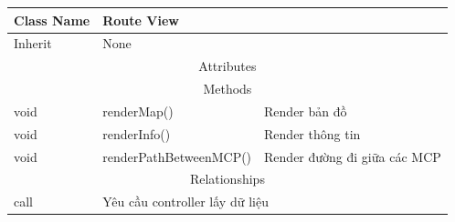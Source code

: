 \begin{enumerate}
        \begin{table}[htp]
            \begin{tabular}{|lll|}
                \hline
                \multicolumn{1}{|l|}{Class Name} & \multicolumn{2}{l|}{Route View}                                          \\ \hline
                \multicolumn{1}{|l|}{Inherit}    & \multicolumn{2}{l|}{None}                                               \\ \hline
                \multicolumn{3}{|c|}{\cellcolor[HTML]{FFFFC7}Attributes}                                                   \\ \hline
                \multicolumn{3}{|c|}{\cellcolor[HTML]{FFFFC7}Methods}                                                      \\ \hline
                \multicolumn{1}{|l|}{void}       & \multicolumn{1}{l|}{renderMap()} & Render bản đồ                        \\ \hline
                \multicolumn{1}{|l|}{void}       & \multicolumn{1}{l|}{renderInfo()}   & Render thông tin                  \\ \hline
                \multicolumn{1}{|l|}{void}       & \multicolumn{1}{l|}{renderPathBetweenMCP()}   & Render đường đi giữa các MCP  \\ \hline
                \multicolumn{3}{|c|}{\cellcolor[HTML]{FFFFC7}Relationships}                                                \\ \hline
                \multicolumn{1}{|l|}{call}   & \multicolumn{2}{l|}{Yêu cầu controller lấy dữ liệu}                         \\ \hline
            \end{tabular}
        \end{table}
    \end{enumerate}